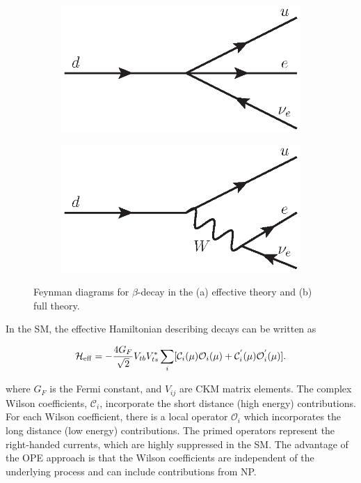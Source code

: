 \begin{figure}[!tb]
\centering
\begin{subfigure}{0.49\textwidth}
\includegraphics[width=\linewidth]{figs/theory/beta_4point.eps}
\caption{}
\label{fig:beta:a}
\end{subfigure}
\begin{subfigure}{0.49\textwidth}
\includegraphics[width=\linewidth]{figs/theory/beta_w.eps}
\caption{} 
\label{fig:beta:b}
\end{subfigure}
\caption{Feynman diagrams for $\beta$-decay in the (a) effective theory and (b) full theory.}
\label{fig:beta}
\end{figure}

In the SM, the effective Hamiltonian describing \btosll decays can be written as

\begin{equation}
\mathcal{H}_{\rm eff} = - \frac{4G_{F}}{\sqrt{2}}V_{tb}V^{*}_{ts}\sum_{i}[\mathcal{C}_{i}(\mu)\mathcal{O}_{i}(\mu) + \mathcal{C}^{'}_{i}(\mu)\mathcal{O}^{'}_{i}(\mu)].
\end{equation}

\noindent where $G_{F}$ is the Fermi constant, and $V_{ij}$ are CKM matrix elements. The complex Wilson coefficients, $\mathcal{C}_{i}$, incorporate the short distance (high energy) contributions. For each Wilson coefficient, there is a local operator $\mathcal{O}_{i}$ which incorporates the long distance (low energy) contributions. The primed operators represent the right-handed currents, which are highly suppressed in the SM. The advantage of the OPE approach is that the Wilson coefficients are independent of the underlying process and can include contributions from NP. 

